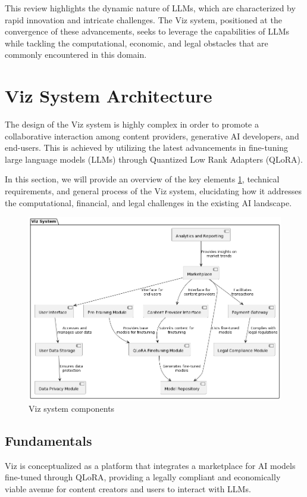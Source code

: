 \documentclass{article}
\begin{document}
This review highlights the dynamic nature of LLMs, which are characterized by rapid innovation and intricate challenges. The Viz system, positioned at the convergence of these advancements, seeks to leverage the capabilities of LLMs while tackling the computational, economic, and legal obstacles that are commonly encountered in this domain.

\section{Viz System Architecture}

The design of the Viz system is highly complex in order to promote a collaborative interaction among content providers, generative AI developers, and end-users. This is achieved by utilizing the latest advancements in fine-tuning large language models (LLMs) through Quantized Low Rank Adapters (QLoRA). 

In this section, we will provide an overview of the key elements \ref{fig:components}, technical requirements, and general process of the Viz system, elucidating how it addresses the computational, financial, and legal challenges in the existing AI landscape.

\begin{figure}[ht]
    \centering
    \includegraphics[width=0.8\linewidth]{viz-1.png}
    \caption{Viz system components}
    \label{fig:components}
\end{figure}

\subsection{Fundamentals}

Viz is conceptualized as a platform that integrates a marketplace for AI models fine-tuned through QLoRA, providing a legally compliant and economically viable avenue for content creators and users to interact with LLMs.
\end{document}
